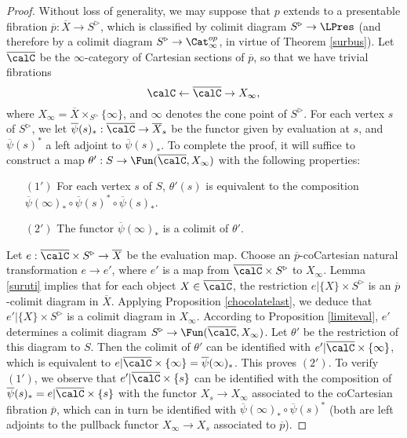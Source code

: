 \begin{proof}
Without loss of generality, we may suppose that $p$ extends to a presentable fibration
$\overline{p}: \overline{X} \rightarrow S^{\triangleright}$, which is classified by colimit
diagram $S^{\triangleright} \rightarrow \LPres$ (and therefore by a colimit diagram
$S^{\triangleright} \rightarrow \Cat^{op}_{\infty}$, in virtue of Theorem \ref{surbus}). Let
$\overline{\calC}$ be the $\infty$-category of Cartesian sections of $\overline{p}$, so that
we have trivial fibrations
$$ \calC \leftarrow \overline{\calC} \rightarrow X_{\infty},$$
where $X_{\infty} = \overline{X} \times_{S^{\triangleright}} \{\infty\}$, and $\infty$
denotes the cone point of $S^{\triangleright}$. For each vertex $s$ of
$S^{\triangleright}$, we let $\overline{\psi}(s)_{\ast}: \overline{\calC} \rightarrow \overline{X}_s$
be the functor given by evaluation at $s$, and $\overline{\psi}(s)^{\ast}$ a left adjoint to
$\overline{\psi}(s)_{\ast}$. To complete the proof, it will suffice to construct a map 
$\theta': S \rightarrow \Fun( \overline{\calC}, X_{\infty})$ with the following properties:
\begin{itemize}
\item[$(1')$] For each vertex $s$ of $S$, $\theta'(s)$ is equivalent to the composition
$\overline{\psi}(\infty)_{\ast} \circ \overline{\psi}(s)^{\ast} \circ \overline{\psi}(s)_{\ast}$. 
\item[$(2')$] The functor $\overline{\psi}(\infty)_{\ast}$ is a colimit of $\theta'$.
\end{itemize}

Let $e: \overline{\calC} \times S^{\triangleright} \rightarrow \overline{X}$ be the evaluation map. 
Choose an $\overline{p}$-coCartesian natural transformation $e \rightarrow e'$, where
$e'$ is a map from $\overline{\calC} \times S^{\triangleright}$ to $X_{\infty}$. Lemma \ref{suruti} implies that for each object $X \in \overline{\calC}$, the restriction 
$e| \{X\} \times S^{\triangleright}$ is an $\overline{p}$-colimit diagram in $\overline{X}$. 
Applying Proposition \ref{chocolatelast}, we deduce that 
$e' | \{X\} \times S^{\triangleright}$ is a colimit diagram in $X_{\infty}$. According to Proposition
\ref{limiteval}, $e'$ determines a colimit diagram $S^{\triangleright} \rightarrow \Fun(\overline{\calC}, X_{\infty})$. Let $\theta'$ be the restriction of this diagram to $S$. Then the colimit of $\theta'$
can be identified with $e' | \overline{\calC} \times \{ \infty \}$, which is equivalent
to $e | \overline{\calC} \times \{\infty \} = \overline{\psi}(\infty)_{\ast}$. This proves $(2')$. 
To verify $(1')$, we observe that $e' | \overline{\calC} \times \{s\}$ can be identified with
the composition of $\overline{\psi}(s)_{\ast} = e | \overline{\calC} \times \{s\}$ with the
functor $X_{s} \rightarrow X_{\infty}$ associated to the coCartesian fibration
$\overline{p}$, which can in turn be identified with $\overline{\psi}(\infty)_{\ast} \circ \overline{\psi}(s)^{\ast}$ (both are left adjoints to the pullback functor
$X_{\infty} \rightarrow X_{s}$ associated to $\overline{p}$). 
\end{proof}


